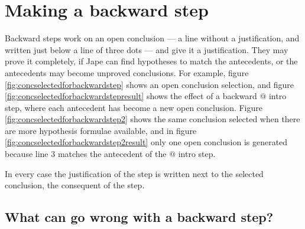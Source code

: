 \documentclass[11pt]{book}
\newcommand{\figref}[1]{figure \ref{fig:#1}}
\newcommand{\Figref}[1]{Figure \ref{fig:#1}}
\begin{document}
\section{Making a backward step}


Backward steps work on an open conclusion --- a line without a justification, and written just below a line of three dots --- and give it a justification. They may prove it completely, if Jape can find hypotheses to match the antecedents, or the antecedents may become unproved conclusions. For example, \figref{concselectedforbackwardstep} shows an open conclusion selection, and \figref{concselectedforbackwardstepresult} shows the effect of a backward $@$ intro step, where each antecedent has become a new open conclusion. \Figref{concselectedforbackwardstep2} shows the same conclusion selected when there are more hypothesis formulae available, and in \figref{concselectedforbackwardstep2result} only one open conclusion is generated because line 3 matches the antecedent of the $@$ intro step.

In every case the justification of the step is written next to the selected conclusion, the consequent of the step.

\subsection{What can go wrong with a backward step?}
\end{document}
